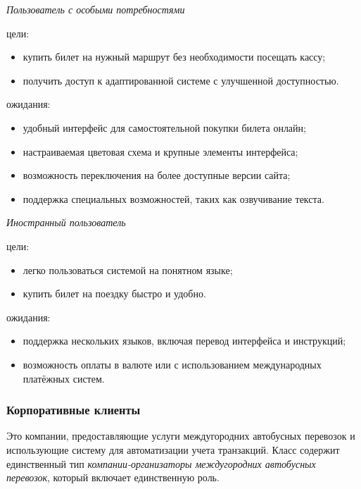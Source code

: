 \null

\noindent\textit{Пользователь с особыми потребностями}

\noindent цели:
\begin{itemize}
    \item купить билет на нужный маршрут без необходимости посещать
    кассу;
    \item получить доступ к адаптированной системе с улучшенной
    доступностью.
\end{itemize}

\noindent ожидания:
\begin{itemize}
    \item удобный интерфейс для самостоятельной покупки билета онлайн;
    \item настраиваемая цветовая схема и крупные элементы интерфейса;
    \item возможность переключения на более доступные версии сайта;
    \item поддержка специальных возможностей, таких как озвучивание
    текста.
\end{itemize}

\null

\noindent\textit{Иностранный пользователь}

\noindent цели:
\begin{itemize}
    \item легко пользоваться системой на понятном языке;
    \item купить билет на поездку быстро и удобно.
\end{itemize}

\noindent ожидания:
\begin{itemize}
    \item поддержка нескольких языков, включая перевод интерфейса и
    инструкций;
    \item возможность оплаты в валюте или с использованием международных
    платёжных систем.
\end{itemize}

\subsubsection*{Корпоративные клиенты}

Это компании, предоставляющие услуги междугородних автобусных перевозок и
использующие систему для автоматизации учета транзакций. Класс содержит
единственный тип \textit{компании-организаторы междугородних автобусных
перевозок}, который включает единственную роль.

